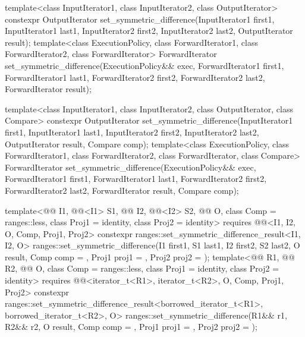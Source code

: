 %
\begin{itemdecl}
template<class InputIterator1, class InputIterator2,
         class OutputIterator>
  constexpr OutputIterator
    set_symmetric_difference(InputIterator1 first1, InputIterator1 last1,
                             InputIterator2 first2, InputIterator2 last2,
                             OutputIterator result);
template<class ExecutionPolicy, class ForwardIterator1, class ForwardIterator2,
         class ForwardIterator>
  ForwardIterator
    set_symmetric_difference(ExecutionPolicy&& exec,
                             ForwardIterator1 first1, ForwardIterator1 last1,
                             ForwardIterator2 first2, ForwardIterator2 last2,
                             ForwardIterator result);

template<class InputIterator1, class InputIterator2,
         class OutputIterator, class Compare>
  constexpr OutputIterator
    set_symmetric_difference(InputIterator1 first1, InputIterator1 last1,
                             InputIterator2 first2, InputIterator2 last2,
                             OutputIterator result, Compare comp);
template<class ExecutionPolicy, class ForwardIterator1, class ForwardIterator2,
         class ForwardIterator, class Compare>
  ForwardIterator
    set_symmetric_difference(ExecutionPolicy&& exec,
                             ForwardIterator1 first1, ForwardIterator1 last1,
                             ForwardIterator2 first2, ForwardIterator2 last2,
                             ForwardIterator result, Compare comp);

template<@@ I1, @@<I1> S1, @@ I2, @@<I2> S2,
         @@ O, class Comp = ranges::less,
         class Proj1 = identity, class Proj2 = identity>
  requires @@<I1, I2, O, Comp, Proj1, Proj2>
  constexpr ranges::set_symmetric_difference_result<I1, I2, O>
    ranges::set_symmetric_difference(I1 first1, S1 last1, I2 first2, S2 last2, O result,
                                     Comp comp = {}, Proj1 proj1 = {},
                                     Proj2 proj2 = {});
template<@@ R1, @@ R2, @@ O,
         class Comp = ranges::less, class Proj1 = identity, class Proj2 = identity>
  requires @@<iterator_t<R1>, iterator_t<R2>, O, Comp, Proj1, Proj2>
  constexpr ranges::set_symmetric_difference_result<borrowed_iterator_t<R1>,
                                                    borrowed_iterator_t<R2>, O>
    ranges::set_symmetric_difference(R1&& r1, R2&& r2, O result, Comp comp = {},
                                     Proj1 proj1 = {}, Proj2 proj2 = {});
\end{itemdecl}

